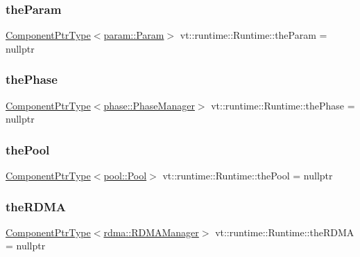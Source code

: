 \subsubsection{\texorpdfstring{the\+Param}{theParam}}
{\footnotesize\ttfamily \hyperlink{structvt_1_1runtime_1_1_runtime_a0893bf0a8c03b898e8ab66b52cec80ad}{Component\+Ptr\+Type}$<$\hyperlink{structvt_1_1param_1_1_param}{param\+::\+Param}$>$ vt\+::runtime\+::\+Runtime\+::the\+Param = nullptr}

\mbox{\label{structvt_1_1runtime_1_1_runtime_aaad9fd5e7f0bb2d4bcc73fe1ce60bd9f}} 
\subsubsection{\texorpdfstring{the\+Phase}{thePhase}}
{\footnotesize\ttfamily \hyperlink{structvt_1_1runtime_1_1_runtime_a0893bf0a8c03b898e8ab66b52cec80ad}{Component\+Ptr\+Type}$<$\hyperlink{structvt_1_1phase_1_1_phase_manager}{phase\+::\+Phase\+Manager}$>$ vt\+::runtime\+::\+Runtime\+::the\+Phase = nullptr}

\mbox{\label{structvt_1_1runtime_1_1_runtime_a060aca8399f1c6499c4676a26db2e39e}} 
\subsubsection{\texorpdfstring{the\+Pool}{thePool}}
{\footnotesize\ttfamily \hyperlink{structvt_1_1runtime_1_1_runtime_a0893bf0a8c03b898e8ab66b52cec80ad}{Component\+Ptr\+Type}$<$\hyperlink{structvt_1_1pool_1_1_pool}{pool\+::\+Pool}$>$ vt\+::runtime\+::\+Runtime\+::the\+Pool = nullptr}

\mbox{\label{structvt_1_1runtime_1_1_runtime_ab8ec604b336a974682b0fec124a4a31b}} 
\subsubsection{\texorpdfstring{the\+R\+D\+MA}{theRDMA}}
{\footnotesize\ttfamily \hyperlink{structvt_1_1runtime_1_1_runtime_a0893bf0a8c03b898e8ab66b52cec80ad}{Component\+Ptr\+Type}$<$\hyperlink{structvt_1_1rdma_1_1_r_d_m_a_manager}{rdma\+::\+R\+D\+M\+A\+Manager}$>$ vt\+::runtime\+::\+Runtime\+::the\+R\+D\+MA = nullptr}

